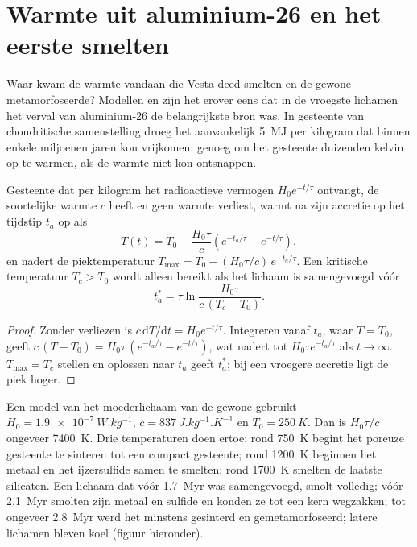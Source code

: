 \section{Warmte uit aluminium-26 en het eerste smelten}

Waar kwam de warmte vandaan die Vesta deed smelten en de gewone
 metamorfoseerde? Modellen en  zijn het erover eens dat in de vroegste lichamen
het verval van aluminium-26 de belangrijkste bron was. In gesteente van chondritische samenstelling droeg het aanvankelijk
\qty{5}{MJ} per kilogram dat binnen enkele miljoenen jaren kon vrijkomen:
genoeg om het gesteente duizenden kelvin op te warmen, als de warmte niet kon ontsnappen.

\begin{proposition}
\label{prop:b2:planet-formation-meteorites:heating}
Gesteente dat per kilogram het radioactieve vermogen $H_0 e^{-t/\tau}$ ontvangt,
de soortelijke warmte $c$ heeft en geen warmte verliest, warmt na zijn accretie op
het tijdstip $t_a$ op als
\[
  T(t) = T_0 + \frac{H_0\tau}{c}\left(e^{-t_a/\tau} - e^{-t/\tau}\right),
\]
en nadert de piektemperatuur
$T_{\max} = T_0 + (H_0\tau/c)\,e^{-t_a/\tau}$. Een kritische temperatuur
$T_c > T_0$ wordt alleen bereikt als het lichaam is samengevoegd vóór
\[
  t_a^* = \tau\ln\frac{H_0\tau}{c\,(T_c - T_0)}.
\]
\end{proposition}

\begin{proof}
Zonder verliezen is $c\,\mathrm dT/\mathrm dt = H_0 e^{-t/\tau}$. Integreren vanaf
$t_a$, waar $T = T_0$, geeft
$c\,(T - T_0) = H_0\tau\,(e^{-t_a/\tau} - e^{-t/\tau})$, wat nadert tot
$H_0\tau e^{-t_a/\tau}$ als $t \to \infty$. $T_{\max} = T_c$ stellen en oplossen
naar $t_a$ geeft $t_a^*$; bij een vroegere accretie ligt de piek hoger.
\end{proof}

Een model van het moederlichaam van de gewone  gebruikt
$H_0 = \qty{1.9e-7}{W.kg^{-1}}$, $c = \qty{837}{J.kg^{-1}.K^{-1}}$ en
$T_0 = \qty{250}{K}$. Dan is $H_0\tau/c$ ongeveer \qty{7400}{K}. Drie
temperaturen doen ertoe: rond \qty{750}{K} begint het poreuze gesteente te sinteren tot een
compact gesteente; rond \qty{1200}{K} beginnen het metaal en het ijzersulfide samen
te smelten; rond \qty{1700}{K} smelten de laatste silicaten. Een lichaam dat
vóór \qty{1.7}{Myr} was samengevoegd, smolt volledig; vóór \qty{2.1}{Myr} smolten zijn metaal en sulfide
en konden ze tot een kern wegzakken; tot ongeveer \qty{2.8}{Myr} werd het minstens
gesinterd en gemetamorfoseerd; latere lichamen bleven koel (figuur hieronder).

